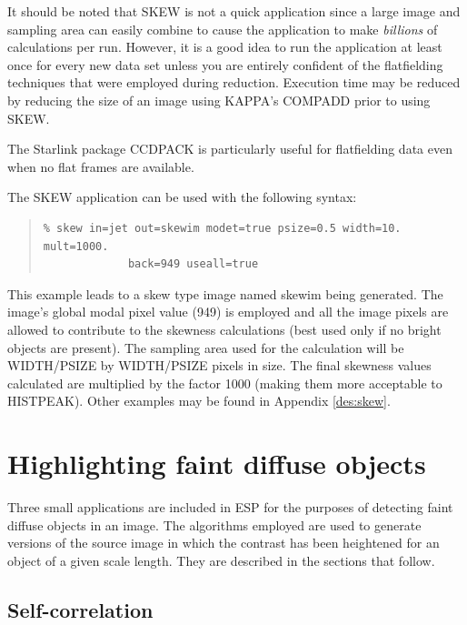 \documentclass[twoside,11pt]{article}
\newcommand{\xref}[3]{#1}
\newenvironment{myquote}{\begin{quote}\begin{small}}{\end{small}\end{quote}}
\begin{document}
It should be noted that SKEW is not a quick application since a large image and 
sampling area can easily combine to cause the application to make {\em billions}
of calculations per run. However, it is a good idea to run the application at 
least once for every new data set unless you are entirely confident of the 
flatfielding techniques that were employed during reduction. Execution time 
may be reduced by reducing the size of an image using \xref{KAPPA}{sun95}{}'s COMPADD prior 
to using SKEW.
                           
The Starlink package \xref{CCDPACK}{sun139}{} is particularly useful for flatfielding data 
even when no flat frames are available.

The SKEW application can be used with the following syntax:

\begin{myquote}
\begin{verbatim}
% skew in=jet out=skewim modet=true psize=0.5 width=10. mult=1000.
             back=949 useall=true 
\end{verbatim}
\end{myquote}

This example leads to a skew type image named skewim being generated. 
The image's global modal pixel value (949) is employed and all the image 
pixels are allowed to contribute to the skewness calculations (best used 
only if no bright objects are present). The sampling area used for the 
calculation will be WIDTH/PSIZE by WIDTH/PSIZE pixels in size. 
The final skewness values calculated are multiplied by the factor 
1000 (making them more acceptable to HISTPEAK). Other examples may be 
found in Appendix \ref{des:skew}.

\section{Highlighting faint diffuse objects}
\label{sec:highlighting}

Three small applications are included in ESP for the purposes of detecting faint
diffuse objects in an image. The algorithms employed are used to generate 
versions of the source image in which the contrast has been heightened for
an object of a given scale length. They are described in the sections that 
follow. 

\subsection{Self-correlation}
\end{document}
